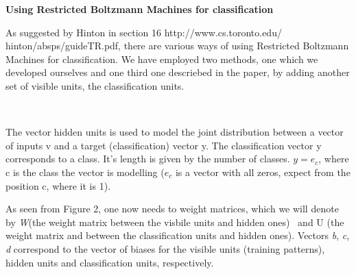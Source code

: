 \documentclass{letter}
\newcommand{\tmtextbf}[1]{{\bfseries{#1}}}
\newcommand{\tmtextit}[1]{{\itshape{#1}}}
\begin{document}
\tmtextbf{Using Restricted Boltzmann Machines for classification}

As suggested by Hinton in section 16 http://www.cs.toronto.edu/\~{
}hinton/absps/guideTR.pdf, there are various ways of using Restricted
Boltzmann Machines for classification. We have employed two methods, one which
we developed ourselves and one third one descriebed in the paper, by adding
another set of visible units, the classification units.



\ \ \ \ \ \ \ \ \ \ \ \ \ \ \ \ \ \ \ \ \ \

The vector hidden units is used to model the joint distribution between a
vector of inputs v and a target (classification) vector y. The classification
vector y corresponds to a class. It's length is given by the number of
classes. $y = e_c$, where c is the class the vector is modelling ($e_c$ is a
vector with all zeros, expect from the position c, where it is 1).

As seen from Figure 2, one now needs to weight matrices, which we will denote
by \tmtextit{W}(the weight matrix between the visbile units and hidden ones) \
and U (the weight matrix and between the classification units and hidden
ones). Vectors \tmtextit{b}, \tmtextit{c}, \tmtextit{d} correspond to the
vector of biases for the visible units (training patterns), hidden units and
classification units, respectively.
\end{document}
